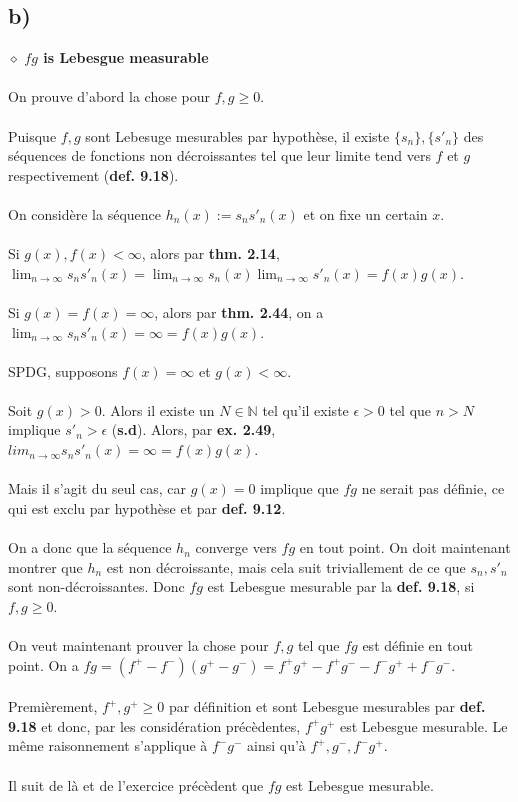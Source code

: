 \documentclass[a4paper,10pt]{article}
\begin{document}
\subsection*{b)}
$\diamond$ \textbf{$fg$ is Lebesgue measurable}
\\
\\
On prouve d'abord la chose pour $f,g \geq 0$.
\\
\\
Puisque $f,g$ sont Lebesuge mesurables par hypothèse, il existe $\{s_n\}, \{s'_n\}$ des séquences de fonctions non décroissantes tel que leur limite tend vers $f$ et $g$ respectivement (\textbf{def. 9.18}).
\\
\\
On considère la séquence $h_n (x) := s_n s'_n (x)$ et on fixe un certain $x$. 
\\
\\
Si $g(x), f(x) < \infty$, alors par \textbf{thm. 2.14}, $\lim_{n \to \infty} s_n s'_n (x) = \lim_{n \to \infty} s_n (x) \lim_{n \to \infty} s'_n (x) = f(x)g(x)$. 
\\
\\
Si $g(x) = f(x) = \infty$, alors par \textbf{thm. 2.44}, on a $\lim_{n \to \infty} s_n s'_n (x) = \infty = f(x) g(x)$.
\\
\\
SPDG, supposons $f(x) = \infty$ et $g(x) < \infty$. 
\\
\\
Soit $g(x) > 0$. Alors il existe un $N \in \mathbb{N}$ tel qu'il existe $\epsilon > 0$ tel que  $n > N$ implique $s'_n > \epsilon$ (\textbf{s.d}). Alors, par \textbf{ex. 2.49}, $lim_{n \to \infty} s_n s'_n(x) = \infty = f(x) g(x)$. 
\\
\\
Mais il s'agit du seul cas, car $g(x) = 0$ implique que $fg$ ne serait pas définie, ce qui est exclu par hypothèse et par \textbf{def. 9.12}.
\\
\\
On a donc que la séquence $h_n$ converge vers $fg$ en tout point. On doit maintenant montrer que $h_n$ est non décroissante, mais cela suit triviallement de ce que $s_n, s'_n$ sont non-décroissantes. Donc $fg$ est Lebesgue mesurable par la \textbf{def. 9.18}, si $f,g \geq 0$.
\\
\\
On veut maintenant prouver la chose pour $f,g$ tel que $fg$ est définie en tout point. On a $fg = (f^+ - f^-)(g^+ - g^-) = f^+ g^+ - f^+ g^- - f^- g^+ + f^- g^-$.
\\
\\
Premièrement, $f^+, g^+ \geq 0$ par définition et sont Lebesgue mesurables par \textbf{def. 9.18} et donc, par les considération précèdentes, $f^+ g^+$ est Lebesgue mesurable. Le même raisonnement s'applique à $f^- g^-$ ainsi qu'à $f^+, g^-, f^- g^+$.
\\
\\
Il suit de là et de l'exercice précèdent que $fg$ est Lebesgue mesurable.
\end{document}
